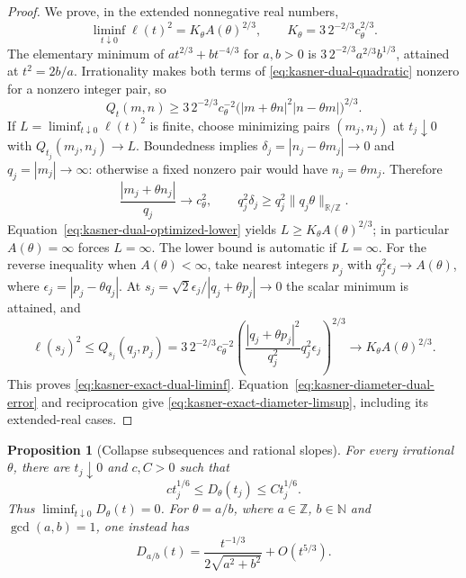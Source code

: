 \documentclass[10pt,a4paper]{article}
\numberwithin{equation}{section}
\newtheorem{proposition}[theorem]{Proposition}
\theoremstyle{definition}
\theoremstyle{remark}
\newcommand{\R}{\mathbb R}
\begin{document}
\begin{proof}
We prove, in the extended nonnegative real numbers,
\begin{equation}
 \liminf_{t\downarrow0}\ell(t)^2
 =K_\theta A(\theta)^{2/3},\qquad
 K_\theta=3\,2^{-2/3}c_\theta^{2/3}.
 \label{eq:kasner-exact-dual-liminf}
\end{equation}
The elementary minimum of $at^{2/3}+bt^{-4/3}$ for $a,b>0$
is $3\,2^{-2/3}a^{2/3}b^{1/3}$, attained at $t^2=2b/a$.
Irrationality makes both terms of \eqref{eq:kasner-dual-quadratic}
nonzero for a nonzero integer pair, so
\begin{equation}
 Q_t(m,n)\ge3\,2^{-2/3}c_\theta^{-2}
 \bigl(|m+\theta n|^2|n-\theta m|\bigr)^{2/3}.
 \label{eq:kasner-dual-optimized-lower}
\end{equation}
If $L=\liminf_{t\downarrow0}\ell(t)^2$ is finite, choose minimizing
pairs $(m_j,n_j)$ at $t_j\downarrow0$ with $Q_{t_j}(m_j,n_j)\to L$.
Boundedness implies $\delta_j=|n_j-\theta m_j|\to0$ and
$q_j=|m_j|\to\infty$: otherwise a fixed nonzero pair would have
$n_j=\theta m_j$.  Therefore
\[
 \frac{|m_j+\theta n_j|}{q_j}\to c_\theta^2,\qquad
 q_j^2\delta_j\ge q_j^2\|q_j\theta\|_{\R/\mathbb Z}.
\]
Equation~\eqref{eq:kasner-dual-optimized-lower} yields
$L\ge K_\theta A(\theta)^{2/3}$; in particular $A(\theta)=\infty$
forces $L=\infty$.  The lower bound is automatic if $L=\infty$.
For the reverse inequality when $A(\theta)<\infty$, take nearest
integers $p_j$ with $q_j^2\epsilon_j\to A(\theta)$, where
$\epsilon_j=|p_j-\theta q_j|$.  At
$s_j=\sqrt2\epsilon_j/|q_j+\theta p_j|\to0$ the scalar minimum
is attained, and
\[
 \ell(s_j)^2\le Q_{s_j}(q_j,p_j)
 =3\,2^{-2/3}c_\theta^{-2}
 \left(\frac{|q_j+\theta p_j|^2}{q_j^2}
             q_j^2\epsilon_j\right)^{2/3}
 \longrightarrow K_\theta A(\theta)^{2/3}.
\]
This proves \eqref{eq:kasner-exact-dual-liminf}.
Equation~\eqref{eq:kasner-diameter-dual-error} and reciprocation give
\eqref{eq:kasner-exact-diameter-limsup}, including its extended-real cases.
\end{proof}

\begin{proposition}[Collapse subsequences and rational slopes]
\label{prop:kasner-arithmetic-completion}
For every irrational $\theta$, there are $t_j\downarrow0$ and
$c,C>0$ such that
\begin{equation}
 c t_j^{1/6}\le D_\theta(t_j)\le C t_j^{1/6}.
 \label{eq:kasner-universal-collapse-subsequence}
\end{equation}
Thus $\liminf_{t\downarrow0}D_\theta(t)=0$.
For $\theta=a/b$, where $a\in\mathbb Z$, $b\in\mathbb N$ and
$\gcd(a,b)=1$, one instead has
\begin{equation}
 D_{a/b}(t)=\frac{t^{-1/3}}{2\sqrt{a^2+b^2}}+O(t^{5/3}).
 \label{eq:kasner-rational-diameter-asymptotic}
\end{equation}
\end{proposition}
\end{document}
